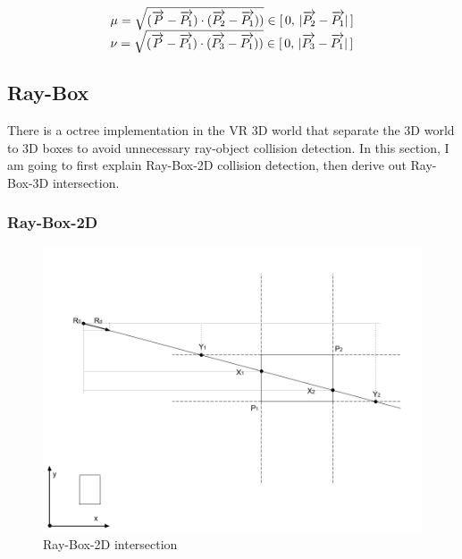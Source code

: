\[
\begin{array}{lr}
\mu = \sqrt{(\overrightarrow{P} - \overrightarrow{P_1}) \cdot (\overrightarrow{P_2} - \overrightarrow{P_1}))} \in [\,0,\,\lvert \overrightarrow{P_2} - \overrightarrow{P_1} \rvert\,] \\
\nu = \sqrt{(\overrightarrow{P} - \overrightarrow{P_1}) \cdot (\overrightarrow{P_3} - \overrightarrow{P_1}))} \in [\,0,\,\lvert \overrightarrow{P_3} - \overrightarrow{P_1} \rvert\,] 
\end{array}
\]

\subsection{Ray-Box}

There is a octree implementation in the VR 3D world that separate the 3D world to 3D boxes to avoid unnecessary ray-object collision detection. In this section, I am going to first explain Ray-Box-2D collision detection, then derive out Ray-Box-3D intersection.

\subsubsection{Ray-Box-2D}

\begin{figure}[H]\label{fig:ray-box-2d}
\centering
\includegraphics[width=\linewidth]{Figures/ray-box-2d-intersection.png}
\decoRule
\caption[ray-box-2d-intersection]{Ray-Box-2D intersection}
\end{figure}

